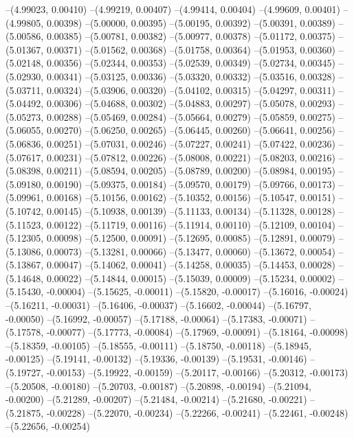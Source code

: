 --(4.99023, 0.00410)
--(4.99219, 0.00407)
--(4.99414, 0.00404)
--(4.99609, 0.00401)
--(4.99805, 0.00398)
--(5.00000, 0.00395)
--(5.00195, 0.00392)
--(5.00391, 0.00389)
--(5.00586, 0.00385)
--(5.00781, 0.00382)
--(5.00977, 0.00378)
--(5.01172, 0.00375)
--(5.01367, 0.00371)
--(5.01562, 0.00368)
--(5.01758, 0.00364)
--(5.01953, 0.00360)
--(5.02148, 0.00356)
--(5.02344, 0.00353)
--(5.02539, 0.00349)
--(5.02734, 0.00345)
--(5.02930, 0.00341)
--(5.03125, 0.00336)
--(5.03320, 0.00332)
--(5.03516, 0.00328)
--(5.03711, 0.00324)
--(5.03906, 0.00320)
--(5.04102, 0.00315)
--(5.04297, 0.00311)
--(5.04492, 0.00306)
--(5.04688, 0.00302)
--(5.04883, 0.00297)
--(5.05078, 0.00293)
--(5.05273, 0.00288)
--(5.05469, 0.00284)
--(5.05664, 0.00279)
--(5.05859, 0.00275)
--(5.06055, 0.00270)
--(5.06250, 0.00265)
--(5.06445, 0.00260)
--(5.06641, 0.00256)
--(5.06836, 0.00251)
--(5.07031, 0.00246)
--(5.07227, 0.00241)
--(5.07422, 0.00236)
--(5.07617, 0.00231)
--(5.07812, 0.00226)
--(5.08008, 0.00221)
--(5.08203, 0.00216)
--(5.08398, 0.00211)
--(5.08594, 0.00205)
--(5.08789, 0.00200)
--(5.08984, 0.00195)
--(5.09180, 0.00190)
--(5.09375, 0.00184)
--(5.09570, 0.00179)
--(5.09766, 0.00173)
--(5.09961, 0.00168)
--(5.10156, 0.00162)
--(5.10352, 0.00156)
--(5.10547, 0.00151)
--(5.10742, 0.00145)
--(5.10938, 0.00139)
--(5.11133, 0.00134)
--(5.11328, 0.00128)
--(5.11523, 0.00122)
--(5.11719, 0.00116)
--(5.11914, 0.00110)
--(5.12109, 0.00104)
--(5.12305, 0.00098)
--(5.12500, 0.00091)
--(5.12695, 0.00085)
--(5.12891, 0.00079)
--(5.13086, 0.00073)
--(5.13281, 0.00066)
--(5.13477, 0.00060)
--(5.13672, 0.00054)
--(5.13867, 0.00047)
--(5.14062, 0.00041)
--(5.14258, 0.00035)
--(5.14453, 0.00028)
--(5.14648, 0.00022)
--(5.14844, 0.00015)
--(5.15039, 0.00009)
--(5.15234, 0.00002)
--(5.15430, -0.00004)
--(5.15625, -0.00011)
--(5.15820, -0.00017)
--(5.16016, -0.00024)
--(5.16211, -0.00031)
--(5.16406, -0.00037)
--(5.16602, -0.00044)
--(5.16797, -0.00050)
--(5.16992, -0.00057)
--(5.17188, -0.00064)
--(5.17383, -0.00071)
--(5.17578, -0.00077)
--(5.17773, -0.00084)
--(5.17969, -0.00091)
--(5.18164, -0.00098)
--(5.18359, -0.00105)
--(5.18555, -0.00111)
--(5.18750, -0.00118)
--(5.18945, -0.00125)
--(5.19141, -0.00132)
--(5.19336, -0.00139)
--(5.19531, -0.00146)
--(5.19727, -0.00153)
--(5.19922, -0.00159)
--(5.20117, -0.00166)
--(5.20312, -0.00173)
--(5.20508, -0.00180)
--(5.20703, -0.00187)
--(5.20898, -0.00194)
--(5.21094, -0.00200)
--(5.21289, -0.00207)
--(5.21484, -0.00214)
--(5.21680, -0.00221)
--(5.21875, -0.00228)
--(5.22070, -0.00234)
--(5.22266, -0.00241)
--(5.22461, -0.00248)
--(5.22656, -0.00254)
